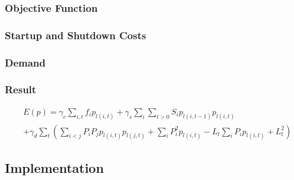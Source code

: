 \subsubsection{Objective Function}


\subsubsection{Startup and Shutdown Costs}


\subsubsection{Demand}


\subsubsection{Result}

\begin{align}
  &
  E(p) = \gamma_c \sum_{i, t} f_i p_{l(i, t)}
  + \gamma_s \sum_i \sum_{t > 0} S_i p_{l(i, t-1)} p_{l(i, t)}
  \\
  &
  + \gamma_d \sum_t \left(
    \sum_{i < j} P_i P_j p_{l(i, t)} p_{l(j, t)}
    + \sum_i P_i^2 p_{l(i, t)} - L_t \sum_i P_i p_{l(i, t)}
    + L_t^2
  \right)
\end{align}


\subsection{Implementation}

